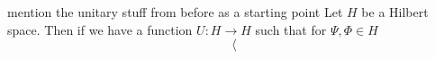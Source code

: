 mention the unitary stuff from before as a starting point
Let $H$ be a Hilbert space. Then if we have a function $U\colon H \to H$ such that for $\Psi,\Phi \in H$
\[
\langle
\]